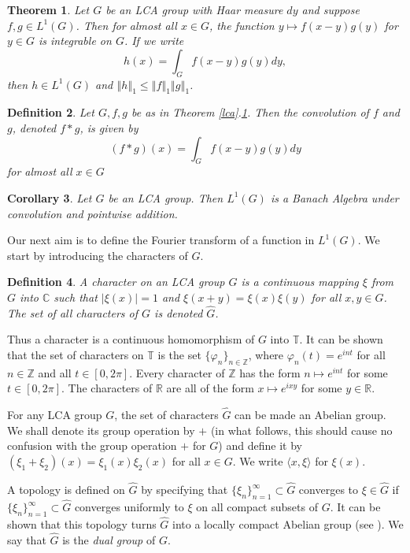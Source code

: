 \documentclass[mstat,12pt]{unswthesis}  %
\newcommand{\R}{\mathbb{R}}
\newcommand{\C}{\mathbb{C}}
\newcommand{\T}{\mathbb{T}}
\newcommand{\Z}{\mathbb{Z}}
\newcommand{\hatt}[1]{\widehat #1}
\newcommand{\reff}[2]{\ref{#1}.\ref{#2}}
\def\ip<#1,#2>{\langle #1,#2 \rangle}
\def\norm#1{\left \Vert #1 \right \Vert}
\newtheorem{theorem}{Theorem}[section]
\newtheorem{corollary}[theorem]{Corollary}
\newtheorem{definition}[theorem]{Definition}
\numberwithin{equation}{section}
\begin{document}
\begin{theorem}\label{convolution}
Let $G$ be an LCA group with Haar measure $dy$
and suppose $f,g\in L^1(G)$. Then for almost all $x\in G$, the function
$y\mapsto f(x-y)g(y)$ for $y\in G$ is integrable on $G$.
If we write 
\[h(x)=\int_G f(x-y)g(y)dy,\]
then $h\in L^1(G)$ and $\norm{h}_1\leq\norm{f}_1\norm{g}_1$.
\end{theorem}

\begin{definition} Let $G,f,g$ be as in Theorem \reff{lca}{convolution}. Then
the {\em convolution} of $f$ and $g$, denoted $f*g$, is given by
\[(f*g)(x)=\int_G f(x-y)g(y)dy\]
for almost all $x\in G$
\end{definition}

\begin{corollary} Let $G$ be an LCA group. Then $L^1(G)$ is a
Banach Algebra under convolution and pointwise addition.
\end{corollary}

Our next aim is to define the Fourier transform of a function in $L^1(G)$.
We start by introducing the characters of $G$.

\begin{definition} A {\em character} on an LCA group $G$ is a continuous mapping
$\xi$ from $G$ into $\C$ such that $|\xi(x)|=1$
and $\xi(x+y)=\xi(x)\xi(y)$ for all $x,y\in G$. The set of all characters of
$G$ is denoted $\hatt{G}$.
\end{definition}

Thus a character is a continuous homomorphism of $G$ into $\T$. It can be shown
that the set of characters on $\T$ is the set $\{\varphi_n\}_{n\in\Z}$, where
$\varphi_n(t)=e^{int}$ for all $n\in\Z$ and all $t\in[0,2\pi]$. Every character
of
$\Z$ has the form $n\mapsto e^{int}$ for some $t\in[0,2\pi]$. The characters of
$\R$ are all of the form $x\mapsto e^{ixy}$ for some $y\in\R$.

For any LCA group $G$, the set of characters $\hatt{G}$ can be made 
an Abelian group. We shall denote its group operation by $+$ (in what follows, 
this should cause no confusion with the group operation $+$ for $G$) and
define it by $(\xi_1+\xi_2)(x)=\xi_1(x)\xi_2(x)$ for all $x\in G$.
We write $\ip<x,\xi>$ for $\xi(x)$.

A topology is defined on $\hatt{G}$ by specifying that
$\{\xi_n\}_{n=1}^{\infty}\subset\hatt{G}$ converges to $\xi\in\hatt{G}$ if
$\{\xi_n\}_{n=1}^{\infty}\subset\hatt{G}$ converges uniformly to $\xi$ on all
compact subsets of $G$. It can be shown that this topology turns $\hatt{G}$ into
a locally compact Abelian group (see \cite[Chapter VII, \S 3]{Katznelson}).
We say that $\hatt{G}$ is the {\em dual group}
of $G$.
\end{document}
